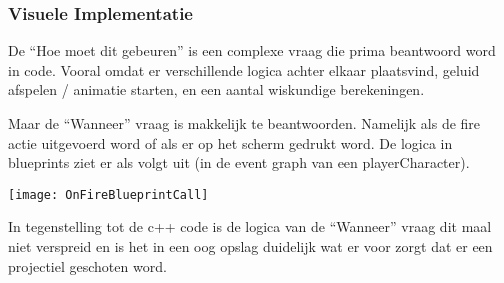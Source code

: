 \subsubsection{Visuele Implementatie}
De “Hoe moet dit gebeuren” is een complexe vraag die prima beantwoord word in code. Vooral omdat er verschillende logica achter elkaar plaatsvind, geluid afspelen / animatie starten, en een aantal wiskundige berekeningen. 

Maar de “Wanneer” vraag is makkelijk te beantwoorden. Namelijk als de fire actie uitgevoerd word of als er op het scherm gedrukt word. De logica in blueprints ziet er als volgt uit (in de event graph van een playerCharacter).

\texttt{[image: OnFireBlueprintCall]}

In tegenstelling tot de c++ code is de logica van de “Wanneer” vraag dit maal niet verspreid en is het in een oog opslag duidelijk wat er voor zorgt dat er een projectiel geschoten word.